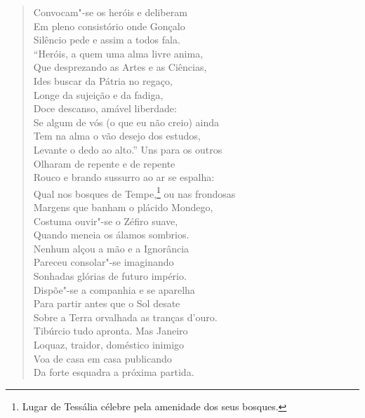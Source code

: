 \begin{verse}
Convocam"-se os heróis e deliberam\\
Em pleno consistório onde Gonçalo\\
Silêncio pede e assim a todos fala.\\
``Heróis, a quem uma alma livre anima,\\
Que desprezando as Artes e as Ciências,\\
Ides buscar da Pátria no regaço,\\
Longe da sujeição e da fadiga,\\
Doce descanso, amável liberdade:\\
Se algum de vós (o que eu não creio) ainda\\
Tem na alma o vão desejo dos estudos,\\
Levante o dedo ao alto.'' Uns para os outros\\ 
Olharam de repente e de repente\\
Rouco e brando sussurro ao ar se espalha:\\
Qual nos bosques de Tempe,\footnote{ Lugar de Tessália célebre pela
amenidade dos seus bosques.} ou nas frondosas\\
Margens que banham o plácido Mondego,\\			\index{\Monde}
Costuma ouvir"-se o Zéfiro suave,\\		\index{\Zefir}
Quando meneia os álamos sombrios.\\
Nenhum alçou a mão e a Ignorância\\			\index{\Ignor}
Pareceu consolar"-se imaginando\\
Sonhadas glórias de futuro império. \\[10pt]


Dispõe"-se a companhia e se aparelha\\
Para partir antes que o Sol desate\\
Sobre a Terra orvalhada as tranças d'ouro.\\
Tibúrcio tudo apronta. Mas Janeiro\\ 		\index{\Jane}
Loquaz, traidor, doméstico inimigo\\
Voa de casa em casa publicando\\
Da forte esquadra a próxima partida. \\[10pt]



\end{verse}
